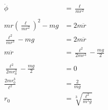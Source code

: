 \documentclass{article}
\begin{document}
\begin{enumerate}
        \begin{align*}
          \dot{\phi}                                    & = \frac{\ell}{m r^2}                     \\ \\
          m r \left( \frac{\ell}{m r^2} \right)^2 - m g & = 2 m \ddot{r}                           \\
          \frac{\ell^2}{m r^3} - m g                    & = 2 m \ddot{r}                           \\
          m \ddot{r}                                    & = \frac{\ell^2}{2 m r^3} - \frac{m g}{2} \\ \\
          \frac{\ell^2}{2 m r_0^3} - \frac{m g}{2}      & = 0                                      \\
          \frac{2 m r_0^3}{\ell^2}                      & = \frac{2}{m g}                          \\
          r_0                                           & = \sqrt[3]{\frac{\ell^2}{m^2 g}}
        \end{align*}
\end{enumerate}

\setcounter{subsection}{38}
\subsection{}
\end{document}
